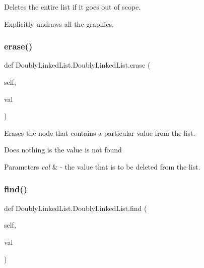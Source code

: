 Deletes the entire list if it goes out of scope. 

Explicitly undraws all the graphics. \mbox{\label{class_doubly_linked_list_1_1_doubly_linked_list_ad8cbc7268bda83aca4799dcaea3ab33e}} 
\subsubsection{\texorpdfstring{erase()}{erase()}}
{\footnotesize\ttfamily def Doubly\+Linked\+List.\+Doubly\+Linked\+List.\+erase (\begin{DoxyParamCaption}\item[{}]{self,  }\item[{}]{val }\end{DoxyParamCaption})}



Erases the node that contains a particular value from the list. 

Does nothing is the value is not found


\begin{DoxyParams}{Parameters}
{\em val} & -\/ the value that is to be deleted from the list. \\
\hline
\end{DoxyParams}
\mbox{\label{class_doubly_linked_list_1_1_doubly_linked_list_ade9f220296c0811e8fd642c2cdfad0d8}} 
\subsubsection{\texorpdfstring{find()}{find()}}
{\footnotesize\ttfamily def Doubly\+Linked\+List.\+Doubly\+Linked\+List.\+find (\begin{DoxyParamCaption}\item[{}]{self,  }\item[{}]{val }\end{DoxyParamCaption})}



